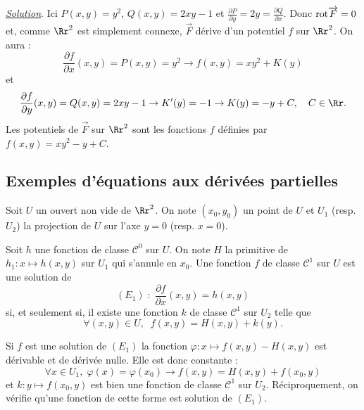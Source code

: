 \documentclass[12pt, class=report,crop=false]{standalone}
\begin{document}
\vskip6mm


\vskip4mm

\noindent \underline{\it Solution}. \rm Ici $P(x,y)=y^2$, $Q(x,y)=2xy-1$ et $\displaystyle \frac{\partial P}{\partial y}=2y=\frac{\partial Q}{\partial x}$. Donc $\mathrm{rot} \overrightarrow{F}=0$ et, comme $\Rr^2$ est simplement connexe, $\overrightarrow{F}$ dérive d'un potentiel $f$ sur $\Rr^2$. On aura :
$$\frac{\partial f}{\partial x}(x,y)=P(x,y)=y^2\rightarrow f(x,y)=xy^2+K(y)$$
et 
$$\frac{\partial f}{\partial y}(x,y)=Q(x,y)=2xy-1\rightarrow K'(y)=-1\rightarrow K(y)=-y+C,\quad C\in \Rr.$$
Les potentiels de $\overrightarrow{F}$ sur $\Rr^2$ sont les fonctions $f$ définies par $f(x,y)=xy^2-y+C$.

\vskip8mm

\subsection{Exemples d'équations aux dérivées partielles}

\vskip4mm

\noindent Soit $U$ un ouvert non vide de $\Rr^2$. On note $(x_0,y_0)$ un point de $U$ et $U_1$ (resp. $U_2$) la projection de $U$ sur l'axe $y=0$ (resp. $x=0$).

\vskip6mm

\begin{proposition}Soit $h$ une fonction de classe $\mathscr{C}^0$ sur $U$. On note $H$ la primitive de $h_1:x\mapsto h(x,y)$ sur $U_1$ qui s'annule en $x_0$. Une fonction $f$ de classe $\mathscr{C}^1$ sur $U$ est une solution de 
$$(E_1)\; :\; \frac{\partial f}{\partial x}(x,y)=h(x,y)$$
si, et seulement si, il existe une fonction $k$ de classe $\mathscr{C}^1$ sur $U_2$ telle que
$$\forall (x,y)\in U,\; \; f(x,y)=H(x,y)+k(y).$$
\end{proposition}

\vskip4mm

Si $f$ est une solution de $(E_1)$ la fonction $\varphi :x\mapsto f(x,y)-H(x,y)$ est dérivable et de dérivée nulle. Elle est donc constante :
$$\forall x\in U_1,\; \varphi (x)=\varphi (x_0)\rightarrow f(x,y)=H(x,y)+f(x_0,y)$$
et $k:y\mapsto f(x_0,y)$ est bien une fonction de classe $\mathscr{C}^1$ sur $U_2$. Réciproquement, on vérifie qu'une fonction de cette forme est solution de $(E_1)$.
\end{document}
